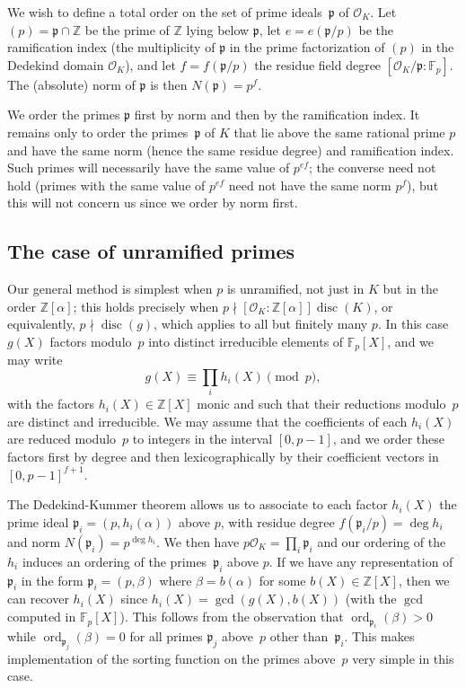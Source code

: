 \documentclass{article}
\def\Sage{{\tt Sage}}
\def\Z{{\mathbb Z}}
\def\F{{\mathbb F}}
\def\Fp{{\mathbb F}_p}
\def\OO{{\mathcal O}}
\def\p{{\mathfrak p}}
\DeclareMathOperator{\disc}{disc}
\DeclareMathOperator{\ord}{ord}
\begin{document}
We wish to define a total order on the set of prime ideals~$\p$
of $\OO_K$.  Let $(p)=\p\cap \Z$ be the prime of $\Z$ lying below $\p$,
let $e=e(\p/p)$ be the ramification index (the multiplicity of $\p$ in the prime factorization of $(p)$ in the Dedekind domain $\OO_K$), and let $f=f(\p/p)$ the residue field degree $[\OO_K/\p:\F_p]$.
The (absolute) norm of $\p$ is then $N(\p)=p^f$.


We order the primes $\p$ first by norm and then by the ramification
index.  It remains only to order the primes~$\p$ of $K$ that lie above
the same rational prime $p$ and have the same norm (hence the same
residue degree) and ramification index.  Such primes will necessarily
have the same value of $p^{ef}$; the converse need not hold (primes
with the same value of $p^{ef}$ need not have the same norm $p^{f}$),
but this will not concern us since we order by norm first.

\subsection{The case of unramified primes}

Our general method is simplest when $p$ is unramified, not just in $K$
but in the order $\Z[\alpha]$; this holds precisely when $p\nmid
[\OO_K:\Z[\alpha]]\disc(K)$, or equivalently, $p\nmid\disc(g)$, which
applies to all but finitely many $p$.  In this case $g(X)$ factors
modulo~$p$ into distinct irreducible elements of $\Fp[X]$, and we may
write
\[
    g(X) \equiv \prod_i h_i(X) \pmod{p},
\]
with the factors $h_i(X)\in\Z[X]$ monic and such that their reductions
modulo~$p$ are distinct and irreducible.  We may assume that the
coefficients of each $h_i(X)$ are reduced modulo~$p$ to integers in the interval $[0,p-1]$, and we order these factors first by degree and then lexicographically by their coefficient vectors in $[0,p-1]^{f+1}$.

The Dedekind-Kummer theorem allows us to associate to each factor
$h_i(X)$ the prime ideal $\p_i=(p,h_i(\alpha))$ above $p$, with
residue degree $f(\p_i/p)=\deg h_i$ and norm $N(\p_i)=p^{\deg h_i}$.
We then have $p\OO_K=\prod_i \p_i$ and our ordering of the $h_i$
induces an ordering of the primes~$\p_i$ above $p$.  If we have any
representation of $\p_i$ in the form $\p_i=(p,\beta)$ where
$\beta=b(\alpha)$ for some $b(X)\in\Z[X]$, then we can recover
$h_i(X)$ since $h_i(X)=\gcd(g(X),b(X))$ (with the $\gcd$ computed in
$\F_p[X]$).  This follows from the observation that
$\ord_{\p_i}(\beta)>0$ while $\ord_{\p_j}(\beta)=0$ for all primes
$\p_j$ above~$p$ other than~$\p_i$.  This makes implementation of the
sorting function on the primes above~$p$ very simple in this case.
\end{document}
